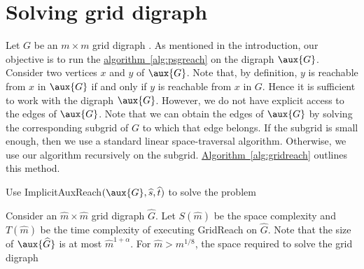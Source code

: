 \documentclass[11pt]{article}
\numberwithin{equation}{section}
\theoremstyle{definition}
\theoremstyle{plain}
\newcommand{\expref}[2]{\hyperref[#2]{#1~\ref{#2}}}
\begin{document}
\section{Solving grid %
digraph %
}
\label{sec:final}
Let $G$ be an $m \times m$ grid %
digraph %
. As mentioned in the introduction, our objective is to run the \expref{algorithm}{alg:psgreach} on the %
digraph %
 $\aux{G}$. Consider two vertices $x$ and $y$ of $\aux{G}$. Note that, by definition, $y$ is reachable from $x$ in $\aux{G}$ if and only if $y$ is reachable from $x$ in $G$. Hence it is sufficient to work with the %
digraph %
 $\aux{G}$. However, we do not have explicit access to the edges of $\aux{G}$. Note that we can obtain the edges of $\aux{G}$ by solving the corresponding subgrid of $G$ to which that edge belongs. If the subgrid is small enough, then we use a standard linear %
space-traversal  %
algorithm. Otherwise, we use our algorithm recursively on the subgrid. \expref{Algorithm}{alg:gridreach} outlines this method.
\begin{algorithm}
\caption{\textsf{GridReach}$(\widehat{G}, \widehat{s}, \widehat{t}, m)$}
\label{alg:gridreach}
\Else
{
Use \textsf{ImplicitAuxReach}$(\aux{G}, \widehat{s}, \widehat{t})$ to solve the problem\;
}
\end{algorithm}

Consider an $\widehat{m} \times \widehat{m}$ grid %
digraph %
 $\widehat{G}$. Let $S(\widehat{m})$ be the space complexity and $T(\widehat{m})$ be the time complexity of executing \textsf{GridReach} on $\widehat{G}$. Note that the size of $\aux{\widehat{G}}$ is at most $\widehat{m}^{1 + \alpha}$. For $\widehat{m} > m^{1/8}$, the space required to solve the grid %
digraph %
\end{document}
